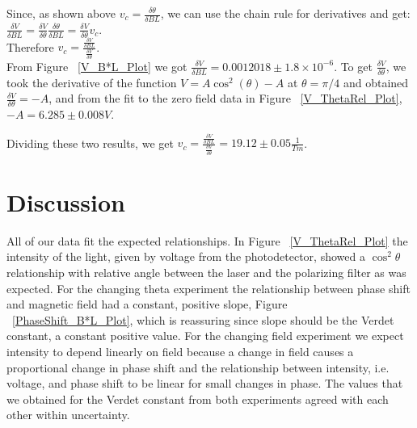\documentclass[prb,preprint]{revtex4-1}
\begin{document}
Since, as shown above $v_c = \frac{\delta \theta}{\delta BL}$, we can use the chain rule for derivatives and get: 
\\
$\frac{\delta V}{\delta BL} = \frac{\delta V}{\delta \theta} \frac{\delta \theta}{\delta BL} = \frac{\delta V}{\delta \theta} v_c$.  
\\
Therefore $v_c = \frac{\frac{\delta V}{\delta BL}}{\frac{\delta V}{\delta \theta}}$.
\\
From Figure ~\ref{V_B*L_Plot} we got $\frac{\delta V}{\delta BL} = 0.0012018 \pm 1.8 \times 10^{-6}$. To get $\frac{\delta V}{\delta \theta}$, we took the derivative of the function $V = A \cos^{2}(\theta) - A$ at $\theta = \pi/4$ and obtained $\frac{\delta V}{\delta \theta} = -A$, and from the fit to the zero field data in Figure ~\ref{V_ThetaRel_Plot}, $-A = 6.285 \pm 0.008 V$.  

Dividing these two results, we get $v_c = \frac{\frac{\delta V}{\delta BL}}{\frac{\delta V}{\delta \theta}} = 19.12 \pm 0.05 \frac{1}{Tm}$.  





\section{Discussion}

All of our data fit the expected relationships. In Figure ~\ref{V_ThetaRel_Plot} the intensity of the light, given by voltage from the photodetector, showed a $\cos^2\theta$ relationship with relative angle between the laser and the polarizing filter as was expected. For the changing theta experiment the relationship between phase shift and magnetic field had a constant, positive slope, Figure ~\ref{PhaseShift_B*L_Plot}, which is reassuring since slope should be the Verdet constant, a constant positive value.  For the changing field experiment we expect intensity to depend linearly on field because a change in field causes a proportional change in phase shift and the relationship between intensity, i.e. voltage, and phase shift to be linear for small changes in phase. The values that we obtained for the Verdet constant from both experiments agreed with each other within uncertainty. 
\end{document}
